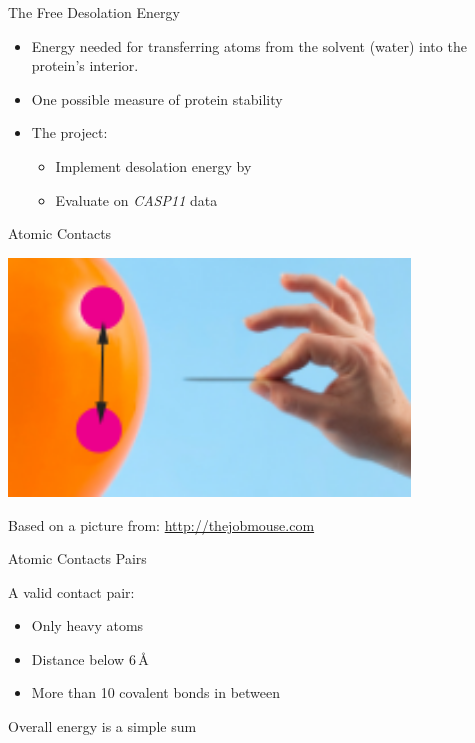 \begin{frame}{The Free Desolation Energy}
    \begin{itemize}[<+->]
        \item Energy needed for transferring atoms from the solvent (water) into
        the protein's interior.
        \item One possible measure of protein stability
        \item The project:
        \begin{itemize}
            \item Implement desolation energy by \cite{Zhang1997}
            \item Evaluate on \emph{CASP11} data
        \end{itemize}
    \end{itemize}
\end{frame}
% 
\begin{frame}{Atomic Contacts}
    \begin{center}
        \includegraphics[width=0.8\textwidth]{ace.png}
    \end{center}
    \begin{flushright}
        \tiny
        \color{gray}Based on a picture from: \url{http://thejobmouse.com}
    \end{flushright}
\end{frame}
%
\begin{frame}{Atomic Contacts Pairs}
    \begin{center}
    \end{center}
    A valid contact pair:
    \begin{itemize}
        \item Only heavy atoms
        \item Distance below 6\,\AA
        \item More than 10 covalent bonds in between\\
    \end{itemize}
    Overall energy is a simple sum
\end{frame}
